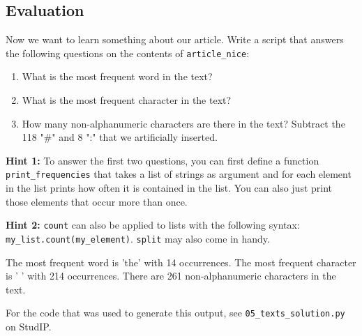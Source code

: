 \subsection{Evaluation}

Now we want to learn something about our article. Write a script that answers the following questions on the contents of \texttt{article\_nice}:

\begin{enumerate}

    \item What is the most frequent word in the text?
    \item What is the most frequent character in the text?
    \item How many non-alphanumeric characters are there in the text? \newline Subtract the 118 "\#" and 8 ":" that we artificially inserted.

\end{enumerate}

\noindent \textbf{Hint 1:} To answer the first two questions, you can first define a function \texttt{print\_frequencies} that takes a list of strings as argument and for each element in the list prints how often it is contained in the list. You can also just print those elements that occur more than once. 

\vspace{1em}

\noindent \textbf{Hint 2:} \texttt{count} can also be applied to lists with the following syntax: \texttt{my\_list.count(my\_element)}. \newline \texttt{split} may also come in handy. 

\vspace{1em}

\begin{solution}

    \begin{outputcode}

The most frequent word is 'the' with 14 occurrences.
The most frequent character is ' ' with 214 occurrences.
There are 261 non-alphanumeric characters in the text.

    \end{outputcode}

\noindent For the code that was used to generate this output, see \texttt{05\_texts\_solution.py} on StudIP.

\end{solution}

